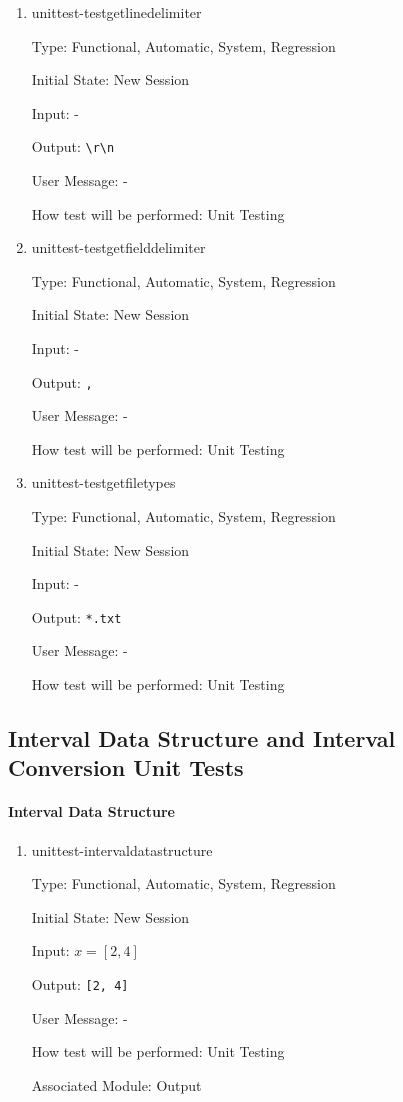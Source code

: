 \documentclass[12pt, titlepage]{article}
\begin{document}
\begin{enumerate}
	
	\item{unittest-testgetlinedelimiter}
	
	Type: Functional, Automatic, System, Regression
	
	Initial State: New Session
	
	Input: -
	
	Output: \texttt{\textbackslash r\textbackslash n}
	
	User Message: - 
	
	How test will be performed: Unit Testing\\
	
	\item{unittest-testgetfielddelimiter}
	
	Type: Functional, Automatic, System, Regression
	
	Initial State: New Session
	
	Input: -
	
	Output: \texttt{,}
	
	User Message: - 
	
	How test will be performed: Unit Testing\\
	
	\item{unittest-testgetfiletypes}
	
	Type: Functional, Automatic, System, Regression
	
	Initial State: New Session
	
	Input: -
	
	Output: \texttt{*.txt}
	
	User Message: - 
	
	How test will be performed: Unit Testing\\
	
\end{enumerate}

\subsection{Interval Data Structure and Interval Conversion Unit Tests}

\paragraph{Interval Data Structure}
\begin{enumerate}
	
	\item{unittest-intervaldatastructure}
	
	Type: Functional, Automatic, System, Regression
	
	Initial State: New Session
	
	Input: $x = [2,4]$
	
	Output: \texttt{[2, 4]}
	
	User Message: - 
	
	How test will be performed: Unit Testing
	
	Associated Module: Output\\
	
\end{enumerate}
\end{document}
